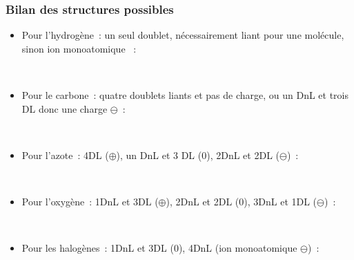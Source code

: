 \documentclass[../main/main.tex]{subfiles}
\begin{document}
\subsubsection{Bilan des structures possibles}
\begin{itemize}[label=$\diamond$]
    \item Pour l'hydrogène~: un seul doublet, nécessairement liant pour une
        molécule, sinon ion monoatomique ~:
        \vspace*{-10pt}
        \begin{center}
            \hfill
            \hfill
            \hfill~
        \end{center}
    \item Pour le carbone~: quatre doublets liants et pas de charge, ou un DnL
        et trois DL donc une charge $\ominus$~:
        \vspace*{-10pt}
        \begin{center}
            \hfill
            \hfill
            \hfill~
        \end{center}
    \item Pour l'azote~: 4DL ($\oplus$), un DnL et 3 DL (0), 2DnL et 2DL
        ($\ominus$)~:
        \begin{center}
            \hfill
            \hfill
            \hfill
            \hfill~
        \end{center}
    \item Pour l'oxygène~: 1DnL et 3DL ($\oplus$), 2DnL et 2DL (0), 3DnL et 1DL
        ($\ominus$)~:
        \begin{center}
            \hfill
            \hfill
            \hfill
            \hfill~
        \end{center}
    \item Pour les halogènes~: 1DnL et 3DL (0), 4DnL (ion monoatomique
        $\ominus$)~:
        \begin{center}
            \hfill
            \hfill
            \hfill~
        \end{center}
\end{itemize}
\end{document}
